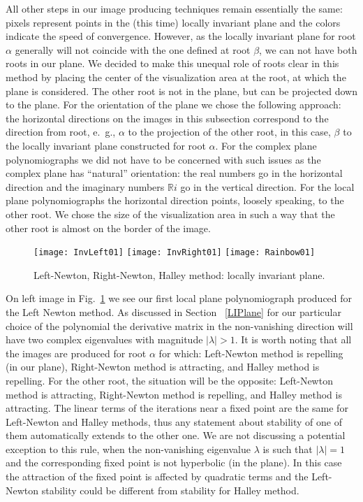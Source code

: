 \documentclass{article}
\theoremstyle{definition}
\def\br {{\mathbb R}} \def\bh {{\mathbb H}} \def\bc {{\mathbb C}} \def\al {\alpha}
\begin{document}
All other steps in our image producing techniques remain essentially the same: pixels represent points in the (this time) locally invariant plane and the colors indicate the speed of convergence. However, as the locally invariant plane for root $\alpha$ generally will not coincide with the one defined at root $\beta$, we can not have both roots in our plane. We decided to make this unequal role of roots clear in this method by placing the center of the visualization area at the root, at which the plane is considered. The other root is not in the plane, but can be projected down to the plane. For the orientation of the plane we chose the following approach: the horizontal directions on the images in this subsection correspond to the direction from root, e.~g., $\alpha$ to the projection of the other root, in this case, $\beta$ to the locally invariant plane constructed for root $\alpha$. For the complex plane polynomiographs we did not have to be concerned with such issues as the complex plane has ``natural'' orientation: the real numbers go in the horizontal direction and the imaginary numbers $\br i$ go in the vertical direction. For the local plane polynomiographs the horizontal direction points, loosely speaking, to the other root. We chose the size of the visualization area in such a way that the other root is almost on the border of the image.

\begin{figure}
\begin{center}
\texttt{[image: InvLeft01]}
\texttt{[image: InvRight01]}
\texttt{[image: Rainbow01]}
\caption{Left-Newton, Right-Newton, Halley method: locally invariant plane.}
\label{LeftLocal}
\end{center}
\end{figure}

On left image in Fig.~\ref{LeftLocal} we see our first local plane polynomiograph produced for the Left Newton method. As discussed in Section ~\ref{LIPlane} for our particular choice of the polynomial the derivative matrix in the non-vanishing direction will have two complex eigenvalues with magnitude $|\lambda|>1$. It is worth noting that all the images are produced for root $\alpha$ for which: Left-Newton method is repelling (in our plane), Right-Newton method is attracting, and Halley method is repelling. For the other root, the situation will be the opposite: Left-Newton method is attracting, Right-Newton method is repelling, and Halley method is attracting. The linear terms of the iterations near a fixed point are the same for Left-Newton and Halley methods, thus any statement about stability of one of them automatically extends to the other one. We are not discussing a potential exception to this rule, when the non-vanishing eigenvalue $\lambda$ is such that $|\lambda|=1$ and the corresponding fixed point is not hyperbolic (in the plane). In this case the attraction of the fixed point is affected by quadratic terms and the Left-Newton stability could be different from stability for Halley method.
\end{document}
